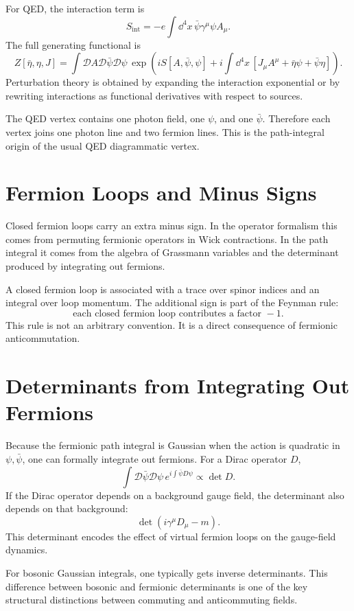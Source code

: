 For QED, the interaction term is
\[
    S_{\mathrm{int}}
    = -e\int\dd^4x\,\bar\psi\gamma^\mu\psi A_\mu.
\]
The full generating functional is
\[
    Z[\bar\eta,\eta,J]
    = \int\mathcal{D}A\mathcal{D}\bar\psi\mathcal{D}\psi\,
      \exp\left(iS[A,\bar\psi,\psi]
      +i\int\dd^4x\,[J_\mu A^\mu+\bar\eta\psi+\bar\psi\eta]\right).
\]
Perturbation theory is obtained by expanding the interaction exponential or by
rewriting interactions as functional derivatives with respect to sources.

The QED vertex contains one photon field, one \(\psi\), and one \(\bar\psi\).
Therefore each vertex joins one photon line and two fermion lines. This is the
path-integral origin of the usual QED diagrammatic vertex.

\section{Fermion Loops and Minus Signs}

Closed fermion loops carry an extra minus sign. In the operator formalism this
comes from permuting fermionic operators in Wick contractions. In the path
integral it comes from the algebra of Grassmann variables and the determinant
produced by integrating out fermions.

A closed fermion loop is associated with a trace over spinor indices and an
integral over loop momentum. The additional sign is part of the Feynman rule:
\[
    \text{each closed fermion loop contributes a factor } -1.
\]
This rule is not an arbitrary convention. It is a direct consequence of
fermionic anticommutation.

\section{Determinants from Integrating Out Fermions}

Because the fermionic path integral is Gaussian when the action is quadratic in
\(\psi,\bar\psi\), one can formally integrate out fermions. For a Dirac operator
\(D\),
\[
    \int\mathcal{D}\bar\psi\mathcal{D}\psi\,
    e^{i\int\bar\psi D\psi}
    \propto \det D.
\]
If the Dirac operator depends on a background gauge field, the determinant also
depends on that background:
\[
    \det(i\gamma^\mu D_\mu-m).
\]
This determinant encodes the effect of virtual fermion loops on the gauge-field
dynamics.

For bosonic Gaussian integrals, one typically gets inverse determinants. This
difference between bosonic and fermionic determinants is one of the key
structural distinctions between commuting and anticommuting fields.

